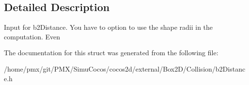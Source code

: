 \subsection{Detailed Description}
Input for b2\+Distance. You have to option to use the shape radii in the computation. Even 

The documentation for this struct was generated from the following file\+:\begin{DoxyCompactItemize}
\item 
/home/pmx/git/\+P\+M\+X/\+Simu\+Cocos/cocos2d/external/\+Box2\+D/\+Collision/b2\+Distance.\+h\end{DoxyCompactItemize}
